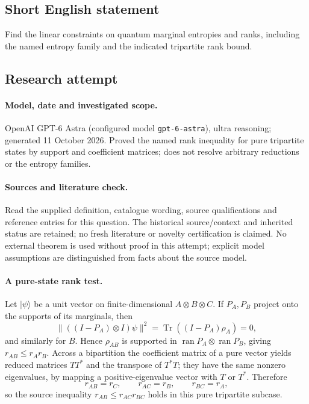 \documentclass[11pt]{article}
\begin{document}
\subsection{Short English statement}
Find the linear constraints on quantum marginal entropies and ranks, including the named entropy family and the indicated tripartite rank bound.
\subsection{Research attempt}
\paragraph{Model, date and investigated scope.}
OpenAI GPT-6 Astra (configured model \texttt{gpt-6-astra}), ultra reasoning; generated 11 October 2026. Proved the named rank inequality for pure tripartite states by support and coefficient matrices; does not resolve arbitrary reductions or the entropy families.

\paragraph{Sources and literature check.}
Read the supplied definition, catalogue wording, source qualifications and reference entries for this question. The historical source/context and inherited status are retained; no fresh literature or novelty certification is claimed. No external theorem is used without proof in this attempt; explicit model assumptions are distinguished from facts about the source model.

\paragraph{A pure-state rank test.} Let \(|\psi\rangle\) be a unit vector on finite-dimensional \(A\otimes B\otimes C\). If \(P_A,P_B\) project onto the supports of its marginals, then
\[
 \|((I-P_A)\otimes I)\psi\|^2=\operatorname{Tr}((I-P_A)\rho_A)=0,
\]
and similarly for \(B\). Hence \(\rho_{AB}\) is supported in \(\operatorname{ran}P_A\otimes\operatorname{ran}P_B\), giving \(r_{AB}\le r_A r_B\). Across a bipartition the coefficient matrix of a pure vector yields reduced matrices \(TT^*\) and the transpose of \(T^*T\); they have the same nonzero eigenvalues, by mapping a positive-eigenvalue vector with \(T\) or \(T^*\). Therefore
\[
 r_{AB}=r_C,\qquad r_{AC}=r_B,\qquad r_{BC}=r_A,
\]
so the source inequality \(r_{AB}\le r_{AC}r_{BC}\) holds in this pure tripartite subcase.
\end{document}
